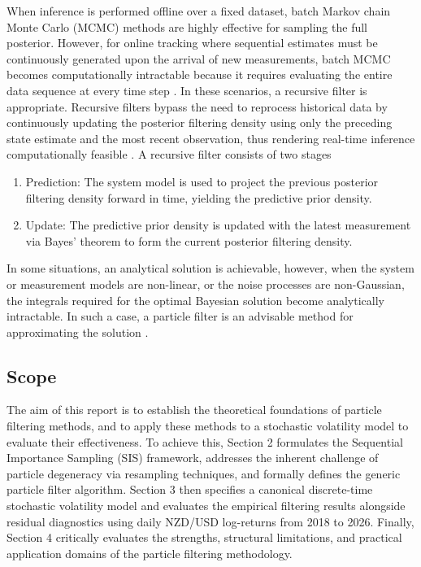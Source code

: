 \documentclass[10pt, a4paper]{article}
\numberwithin{equation}{section}
\begin{document}
When inference is performed offline over a fixed dataset, batch Markov chain Monte Carlo (MCMC) methods are highly effective for sampling the full posterior. However, for online tracking where sequential estimates must be continuously generated upon the arrival of new measurements, batch MCMC becomes computationally intractable because it requires evaluating the entire data sequence at every time step \parencite{Andrieu2010}. In these scenarios, a recursive filter is appropriate. Recursive filters bypass the need to reprocess historical data by continuously updating the posterior filtering density using only the preceding state estimate and the most recent observation, thus rendering real-time inference computationally feasible \parencite{Akyildiz2020}. A recursive filter consists of two stages \parencite{Arulampalam2002}
\begin{enumerate}
    \item Prediction: The system model is used to project the previous posterior filtering density forward in time, yielding the predictive prior density.
    \item Update: The predictive prior density is updated with the latest measurement via Bayes' theorem to form the current posterior filtering density.
\end{enumerate}
In some situations, an analytical solution is achievable, however, when the system or measurement models are non-linear, or the noise processes are non-Gaussian, the integrals required for the optimal Bayesian solution become analytically intractable. In such a case, a particle filter is an advisable method for approximating the solution \parencite{Elfring2021}.

\subsection{Scope}
The aim of this report is to establish the theoretical foundations of particle filtering methods, and to apply these methods to a stochastic volatility model to evaluate their effectiveness. To achieve this, Section 2 formulates the Sequential Importance Sampling (SIS) framework, addresses the inherent challenge of particle degeneracy via resampling techniques, and formally defines the generic particle filter algorithm. Section 3 then specifies a canonical discrete-time stochastic volatility model and evaluates the empirical filtering results alongside residual diagnostics using daily NZD/USD log-returns from 2018 to 2026. Finally, Section 4 critically evaluates the strengths, structural limitations, and practical application domains of the particle filtering methodology.
\end{document}
